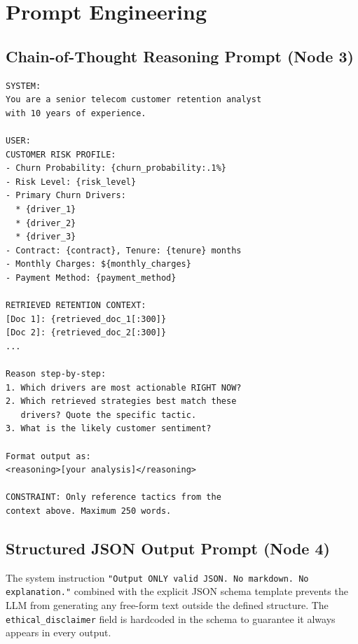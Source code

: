 \documentclass[11pt]{article}
\begin{document}
\section{Prompt Engineering}
\label{sec:prompts}

\subsection{Chain-of-Thought Reasoning Prompt (Node 3)}

\begin{lstlisting}[caption={Risk interpretation prompt sent to the LLM in Node 3.}]
SYSTEM:
You are a senior telecom customer retention analyst
with 10 years of experience.

USER:
CUSTOMER RISK PROFILE:
- Churn Probability: {churn_probability:.1%}
- Risk Level: {risk_level}
- Primary Churn Drivers:
  * {driver_1}
  * {driver_2}
  * {driver_3}
- Contract: {contract}, Tenure: {tenure} months
- Monthly Charges: ${monthly_charges}
- Payment Method: {payment_method}

RETRIEVED RETENTION CONTEXT:
[Doc 1]: {retrieved_doc_1[:300]}
[Doc 2]: {retrieved_doc_2[:300]}
...

Reason step-by-step:
1. Which drivers are most actionable RIGHT NOW?
2. Which retrieved strategies best match these
   drivers? Quote the specific tactic.
3. What is the likely customer sentiment?

Format output as:
<reasoning>[your analysis]</reasoning>

CONSTRAINT: Only reference tactics from the
context above. Maximum 250 words.
\end{lstlisting}

\subsection{Structured JSON Output Prompt (Node 4)}

The system instruction \texttt{"Output ONLY valid JSON. No markdown.
No explanation."} combined with the explicit JSON schema template prevents
the LLM from generating any free-form text outside the defined structure.
The \texttt{ethical\_disclaimer} field is hardcoded in the schema to
guarantee it always appears in every output.
\end{document}
